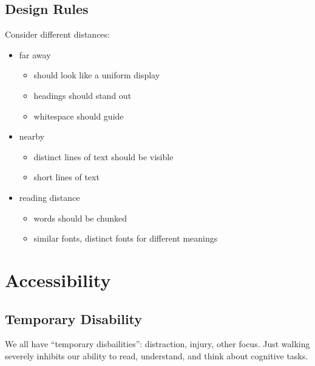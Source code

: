 \documentclass[]{article}
\theoremstyle{definition}
\begin{document}
	\subsection{Design Rules}
	Consider different distances:
	\begin{itemize}
		\item far away
			\begin{itemize}
				\item should look like a uniform display
				\item headings should stand out
				\item whitespace should guide
			\end{itemize}
		\item nearby
			\begin{itemize}
				\item distinct lines of text should be visible
				\item short lines of text
			\end{itemize}
		\item reading distance
			\begin{itemize}
				\item words should be chunked
				\item similar fonts, distinct fonts for different meanings
			\end{itemize}
	\end{itemize}

	\section{Accessibility}

	\subsection{Temporary Disability}
	We all have ``temporary disbailities'': distraction, injury, other focus. Just walking
	severely inhibits our ability to read, understand, and think about cognitive tasks.
\end{document}
